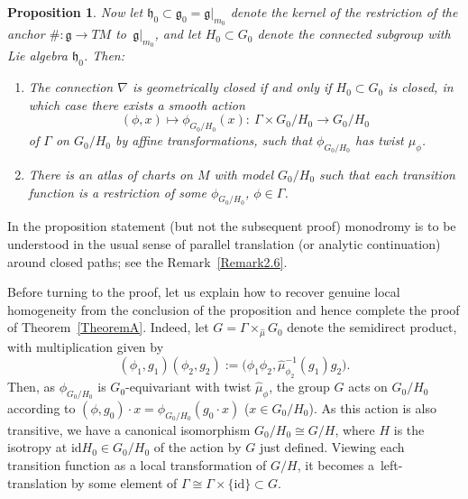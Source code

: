 \documentclass[11pt]{article}
\newcommand\identity{\mathrm{id}}
\numberwithin{equation}{section}
\newtheorem{PropositionBlaom}[TheoremBlaom]{Proposition}
 { \theoremstyle{definition}
\newtheorem{CounterexampleBlaom}[TheoremBlaom]{Counterexample}
\newtheorem{RemarkBlaom}[TheoremBlaom]{Remark} }
\begin{document}
\begin{PropositionBlaom}
  Now let ${\mathfrak h}_0 \subset {\mathfrak g}_0={\mathfrak g}|_{m_0}$
  denote the kernel of the restriction of the anchor $\# \colon
  \mathfrak g \rightarrow TM$ to~$\mathfrak g|_{m_0}$, and let $H_0
  \subset G_0$ denote the connected subgroup with Lie algebra
  ${\mathfrak h}_0$. Then:
  \begin{enumerate}\itemsep=0pt
  \item[$(3)$] %
  The connection $\nabla $ is geometrically closed if
    and only if $H_0 \subset G_0$ is closed, in which case there
    exists a smooth action
    \[
    (\phi,x)\mapsto \phi_{G_0/H_0}(x) \colon \
    \Gamma \times {G_0/H_0} \rightarrow {G_0/H_0}
    \] of $\Gamma $ on
    ${G_0/H_0} $ by affine transformations, such that $\phi_{G_0/H_0}
    $ has twist $\hat \mu_\phi$.
  \item[$(4)$]%
   There is an atlas of charts on $M$ with model ${G_0/H_0}$ such
    that each transition function is a restriction of some
    $\phi_{G_0/H_0}$, $\phi \in \Gamma$.
  \end{enumerate}
\end{PropositionBlaom}

\begin{RemarkBlaom}\label{Remark5.2}
  In the proposition statement (but not the subsequent proof)
  monodromy is to be understood in the usual sense of parallel
  translation (or analytic continuation) around closed paths; see the
  Remark~\ref{Remark2.6}.
\end{RemarkBlaom}

Before turning to the proof, let us explain how to recover genuine
local homogeneity from the conclusion of the proposition and hence
complete the proof of Theorem~\ref{TheoremA}. Indeed, let $G=\Gamma
\times_{\hat\mu} G_0$ denote the semidirect product, with
multiplication given by \begin{equation*}
  (\phi_1,g_1)(\phi_2,g_2):=\big( \phi_1
  \phi_2,\hat{\mu}_{\phi_2}^{-1}(g_1)g_2 \big).
\end{equation*}
Then, as $\phi_{G_0/H_0} $ is $G_0$-equivariant with twist $\hat
\mu_\phi$, the group $G$ acts on ${G_0/H_0}$ according to
$(\phi,g_0)\cdot x = \phi_{G_0/H_0}(g_0 \cdot x)$ ($x \in
G_0/H_0$). As this action is also transitive, we have a canonical
isomorphism ${G_0/H_0} \cong G/H$, where $H$ is the isotropy at $\mathrm{id} H_0
\in {G_0/H_0} $ of the action by $G$ just def\/ined. Viewing each
transition function as a local transformation of $G/H$, it becomes a~left-translation by some element of $\Gamma \cong \Gamma \times
\{\identity\}\subset G$.
\end{document}
